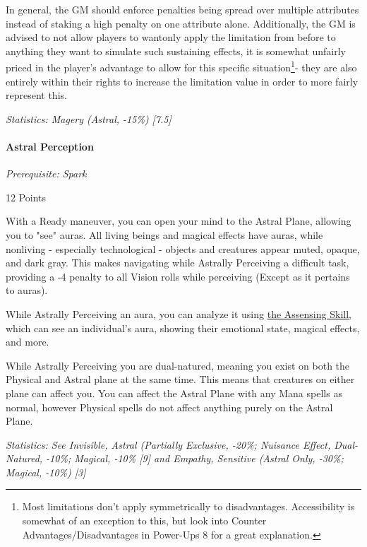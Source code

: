 \begin{multicols*}{3}
	In general, the GM should enforce penalties being spread over multiple attributes instead of staking a high penalty on one attribute alone. Additionally, the GM is advised to not allow players to wantonly apply the limitation from before to anything they want to simulate such sustaining effects, it is somewhat unfairly priced in the player's advantage to allow for this specific situation\footnote{Most limitations don't apply symmetrically to disadvantages. Accessibility is somewhat of an exception to this, but look into Counter Advantages/Disadvantages in Power-Ups 8 for a great explanation.}- they are also entirely within their rights to increase the limitation value in order to more fairly represent this.
	
	\textit{\textcolor{OliveGreen}{Statistics: Magery (Astral, -15\%) [7.5]}}
	
	\paragraph{Astral Perception}\label{astral_perception}
	\textit{Prerequisite: Spark}
	\begin{flushright}
		12 Points
	\end{flushright}
	
	With a Ready maneuver, you can open your mind to the Astral Plane, allowing you to "see" auras. All living beings and magical effects have auras, while nonliving - especially technological - objects and creatures appear muted, opaque, and dark gray. This makes navigating while Astrally Perceiving a difficult task, providing a -4 penalty to all Vision rolls while perceiving (Except as it pertains to auras). 
	
	While Astrally Perceiving an aura, you can analyze it using \hyperref[assensing_skill]{the Assensing Skill,} which can see an individual's aura, showing their emotional state, magical effects, and more.
	
	While Astrally Perceiving you are dual-natured, meaning you exist on both the Physical and Astral plane at the same time. This means that creatures on either plane can affect you. You can affect the Astral Plane with any Mana spells as normal, however Physical spells do not affect anything purely on the Astral Plane.
	
	\textit{\textcolor{OliveGreen}{Statistics: See Invisible, Astral (Partially Exclusive, -20\%; Nuisance Effect, Dual-Natured, -10\%; Magical, -10\% [9] and Empathy, Sensitive (Astral Only, -30\%; Magical, -10\%) [3]}}
	

\end{multicols*}
